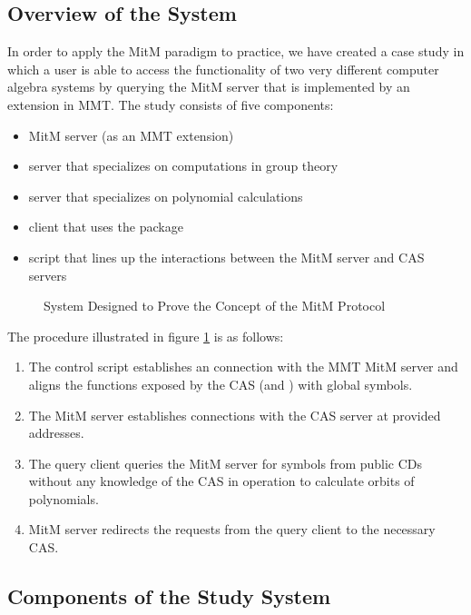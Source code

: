 \subsection{Overview of the System}
In order to apply the MitM paradigm to practice, we have created a case study 
\cite{MitM-PoC} in which a user is able to access the functionality of two very 
different computer algebra systems by querying the MitM server that is 
implemented by an extension in MMT. The study consists of five components:
\begin{itemize}
  \item MitM server (as an MMT extension)
  \item \GAP \SCSCP server that specializes on computations in group theory
  \item \Singular \SCSCP server that specializes on polynomial calculations
  \item \Python client that uses the \SCSCP package
  \item \Python script that lines up the interactions between the MitM server and CAS servers
\end{itemize}

\begin{figure}[ht]\centering
  
  \caption[\GAP-\Singular MitM Interaction]{
    System Designed to Prove the Concept of the MitM Protocol
  }\label{fig:mitmpoc}
\end{figure}

The procedure illustrated in figure \ref{fig:mitmpoc} is as follows:
\begin{enumerate}
  \item The control script establishes an \SCSCP connection with the MMT MitM 
    server and aligns the functions exposed by the CAS (\GAP and \Singular) with
    global symbols.
  \item The MitM server establishes \SCSCP connections with the CAS server at
    provided addresses.
  \item The query client queries the MitM server for symbols from public CDs
    without any knowledge of the CAS in operation to calculate orbits of 
    polynomials.
  \item MitM server redirects the requests from the query client to the necessary
    CAS.
\end{enumerate}

\subsection{Components of the Study System}
